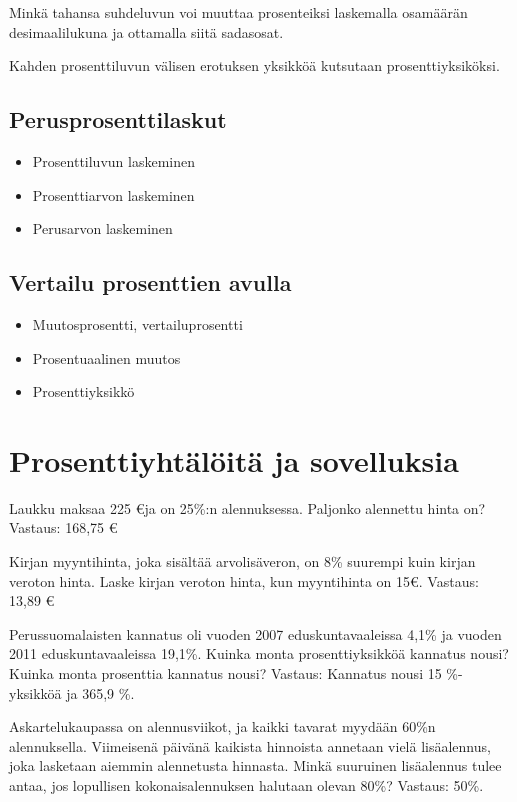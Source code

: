 Minkä tahansa suhdeluvun voi muuttaa prosenteiksi laskemalla osamäärän desimaalilukuna ja ottamalla siitä sadasosat.

Kahden prosenttiluvun välisen erotuksen yksikköä kutsutaan prosenttiyksiköksi.

\section{Perusprosenttilaskut}

\begin{itemize}
	\item Prosenttiluvun laskeminen
	\item Prosenttiarvon laskeminen
	\item Perusarvon laskeminen
\end{itemize}

\section{Vertailu prosenttien avulla}

\begin{itemize}
	\item Muutosprosentti, vertailuprosentti
	\item Prosentuaalinen muutos
	\item Prosenttiyksikkö
\end{itemize}

\chapter{Prosenttiyhtälöitä ja sovelluksia}

Laukku maksaa 225 \euro ja on 25\%:n alennuksessa. Paljonko alennettu hinta on?
Vastaus: 168,75 \euro

Kirjan myyntihinta, joka sisältää arvolisäveron, on 8\% suurempi kuin kirjan veroton hinta. Laske kirjan veroton hinta, kun myyntihinta on 15\euro.
Vastaus: 13,89 \euro

Perussuomalaisten kannatus oli vuoden 2007 eduskuntavaaleissa 4,1\% ja vuoden 2011 eduskuntavaaleissa 19,1\%. Kuinka monta prosenttiyksikköä kannatus nousi? Kuinka monta prosenttia kannatus nousi?
Vastaus: Kannatus nousi 15 \%-yksikköä ja 365,9 \%.

Askartelukaupassa on alennusviikot, ja kaikki tavarat myydään 60\%n alennuksella. Viimeisenä päivänä kaikista hinnoista annetaan vielä lisäalennus, joka lasketaan aiemmin alennetusta hinnasta. Minkä suuruinen lisäalennus tulee antaa, jos lopullisen kokonaisalennuksen halutaan olevan 80\%?
Vastaus: 50\%.

